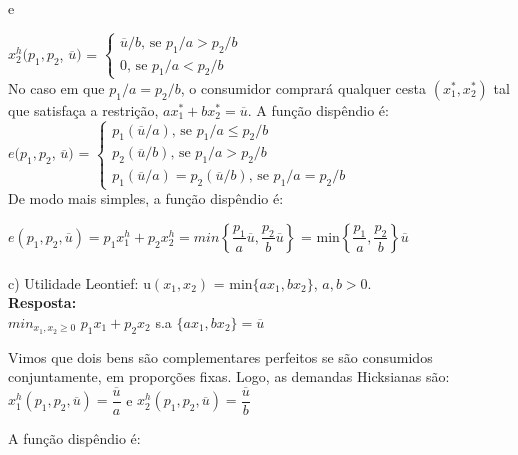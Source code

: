 \begin{enumerate}
e

{$x_{2}^{h}(p_{1},p_{2}$}, {$\overline{u})$} = 
{$\begin{cases} \overline{u}/b\textrm{, se } p_1/a > p_2/b\\
0\textrm{, se } p_1/a < p_2/b
\end{cases}$} 
\\

No caso em que {$p_1/a = p_2/b$}, o consumidor comprará qualquer cesta {$(x_{1}^{*},x_{2}^{*})$} tal que satisfaça a restrição, {$ax^{*}_{1} + bx_{2}^{*} = \overline{u}$}. A função dispêndio é:
\\

{$e(p_{1},p_{2}$}, {$\overline{u})$} = 
{$\begin{cases} p_{1}(\overline{u}/a)\textrm{, se } p_1/a \leq p_2/b\\
p_{2}(\overline{u}/b)\textrm{, se } p_1/a > p_2/b\\
p_{1}(\overline{u}/a) = p_{2}(\overline{u}/b)\textrm{, se } p_1/a = p_2/b
\end{cases}$} 
\\

De modo mais simples, a função dispêndio é: 

{$e(p_{1}, p_{2}, \overline{u}) = p_{1}x^{h}_{1}+ p_{2}x^{h}_{2} = min \left\lbrace\dfrac{p_1}{a}\overline{u}, \dfrac{p_{2}}{b} \overline{u} \right\rbrace$} = min{$\left\lbrace\dfrac{p_1}{a}, \dfrac{p_{2}}{b}\right\rbrace \overline{u}$}\\


\paragraph{}c) Utilidade Leontief: u{$(x_1, x_2)$} = min{$\{ax_1, bx_2\}$}, {$a, b > 0$}.\\

\textbf{Resposta:}\\

{$min_{{x_{1}, x_{2} \geq 0}}$} {$p_{1}x_{1} + p_{2}x_{2}$} s.a {$\{ax_{1},bx_{2}\} = \overline{u}$}

Vimos que dois bens são complementares perfeitos se são consumidos conjuntamente, em proporções fixas. Logo, as demandas Hicksianas são:\\


{$x^{h}_{1}(p_1, p_2, \overline{u}) = \dfrac{\overline{u}}{a}$}
e 
{$x^{h}_{2}(p_1, p_2, \overline{u}) = \dfrac{\overline{u}}{b}$}

A função dispêndio é: 


\end{enumerate}
